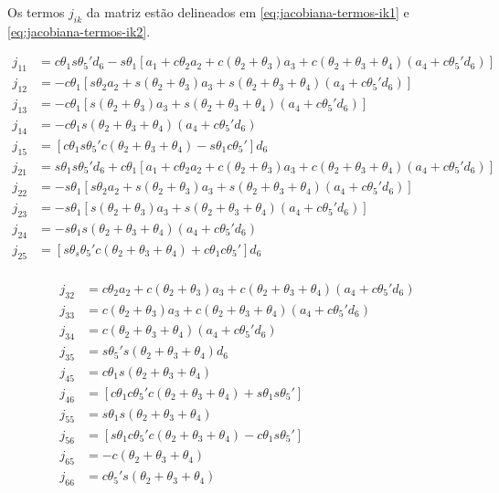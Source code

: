 Os termos $j_{ik}$ da matriz estão delineados em \ref{eq:jacobiana-termos-ik1} e \ref{eq:jacobiana-termos-ik2}.

\begin{align}
    \label{eq:jacobiana-termos-ik1}
    j_{11} &= c\theta_1s\theta_5'd_6 - s\theta_1[a_1 + c\theta_2a_2 + c(\theta_2 + \theta_3)a_3 + c(\theta_2+\theta_3+\theta_4)(a_4 + c\theta_5'd_6)] \nonumber \\
    j_{12} &= - c\theta_1[s\theta_2a_2 + s(\theta_2 + \theta_3)a_3 + s(\theta_2+\theta_3+\theta_4)(a_4 + c\theta_5'd_6)] \nonumber \\
    j_{13} &= - c\theta_1[s(\theta_2+\theta_3)a_3 + s(\theta_2+\theta_3+\theta_4)(a_4 + c\theta_5'd_6)] \nonumber \\
    j_{14} &= - c\theta_1s(\theta_2+\theta_3+\theta_4)(a_4 + c\theta_5'd_6) \nonumber \\
    j_{15} &= [c\theta_1s\theta_5'c(\theta_2+\theta_3+\theta_4) - s\theta_1c\theta_5']d_6 \nonumber \\
    j_{21} &= s\theta_1s\theta_5'd_6 + c\theta_1[a_1 + c\theta_2a_2 + c(\theta_2 + \theta_3)a_3 + c(\theta_2+\theta_3+\theta_4)(a_4 + c\theta_5'd_6)] \nonumber \\
    j_{22} &= - s\theta_1[s\theta_2a_2 + s(\theta_2 + \theta_3)a_3 + s(\theta_2+\theta_3+\theta_4)(a_4 + c\theta_5'd_6)] \nonumber \\
    j_{23} &= - s\theta_1[s(\theta_2+\theta_3)a_3 + s(\theta_2+\theta_3+\theta_4)(a_4 + c\theta_5'd_6)] \nonumber \\
    j_{24} &= - s\theta_1s(\theta_2+\theta_3+\theta_4)(a_4 + c\theta_5'd_6) \nonumber \\
    j_{25} &= [s\theta_s\theta_5'c(\theta_2+\theta_3+\theta_4) + c\theta_1c\theta_5']d_6 \nonumber \\
\end{align}

\begin{align}
    \label{eq:jacobiana-termos-ik2}
    j_{32} &= c\theta_2a_2 + c(\theta_2 + \theta_3)a_3 + c(\theta_2+\theta_3+\theta_4)(a_4 + c\theta_5'd_6) \nonumber \\
    j_{33} &= c(\theta_2+\theta_3)a_3 + c(\theta_2+\theta_3+\theta_4)(a_4 + c\theta_5'd_6) \nonumber \\
    j_{34} &= c(\theta_2+\theta_3+\theta_4)(a_4 + c\theta_5'd_6) \nonumber \\
    j_{35} &= s\theta_5's(\theta_2+\theta_3+\theta_4)d_6 \nonumber \\
    j_{45} &= c\theta_1s(\theta_2+\theta_3+\theta_4) \nonumber \\
    j_{46} &= [c\theta_1c\theta_5'c(\theta_2+\theta_3+\theta_4) + s\theta_1s\theta_5'] \nonumber \\
    j_{55} &= s\theta_1s(\theta_2+\theta_3+\theta_4) \nonumber \\
    j_{56} &= [s\theta_1c\theta_5'c(\theta_2+\theta_3+\theta_4) - c\theta_1s\theta_5'] \nonumber \\
    j_{65} &= -c(\theta_2+\theta_3+\theta_4) \nonumber \\
    j_{66} &= c\theta_5's(\theta_2+\theta_3+\theta_4) \nonumber \\
\end{align}

